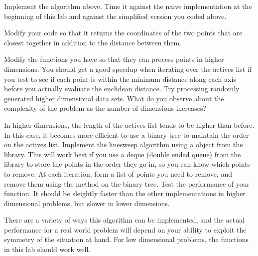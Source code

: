 \begin{problem}
Implement the algorithm above. 
Time it against the naive implementation at the beginning of this lab and against the simplified version you coded above.
\end{problem}

\begin{problem}
Modify your code so that it returns the coordinates of the two points that are closest together in addition to the distance between them.
\end{problem}

\begin{problem}
Modify the functions you have so that they can process points in higher dimensions. 
You should get a good speedup when iterating over the actives list if you test to see if each point is within the minimum distance along each axis before you actually evaluate the euclidean distance. 
Try processing randomly generated higher dimensional data sets. 
What do you observe about the complexity of the problem as the number of dimensions increases?
\end{problem}

\begin{problem}
In higher dimensions, the length of the actives list tends to be higher than before. In this case, it becomes more efficient to use a binary tree to maintain the order on the actives list. 
Implement the linesweep algorithm using a  object from the  library. 
This will work best if you use a deque (double ended queue) from the  library to store the points in the order they go in, so you can know which points to remove. 
At each iteration, form a list of points you need to remove, and remove them using the  method on the binary tree. 
Test the performance of your function. 
It should be sleightly faster than the other implementations in higher dimensional problems, but slower in lower dimensions.
\end{problem}

There are a variety of ways this algorithm can be implemented, and the actual performance for a real world problem will depend on your ability to exploit the symmetry of the situation at hand. 
For low dimensional problems, the functions in this lab should work well.
